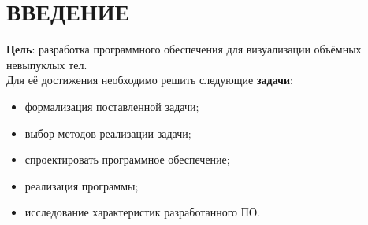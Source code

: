 \chapter*{ВВЕДЕНИЕ}
\textbf{Цель}: разработка программного обеспечения для визуализации
объёмных невыпуклых тел. \\
Для её достижения необходимо решить следующие \textbf{задачи}:
\begin{itemize}
    \item формализация поставленной задачи;
    \item выбор методов реализации задачи;
    \item спроектировать программное обеспечение;
    \item реализация программы;
    \item исследование характеристик разработанного ПО.
\end{itemize}